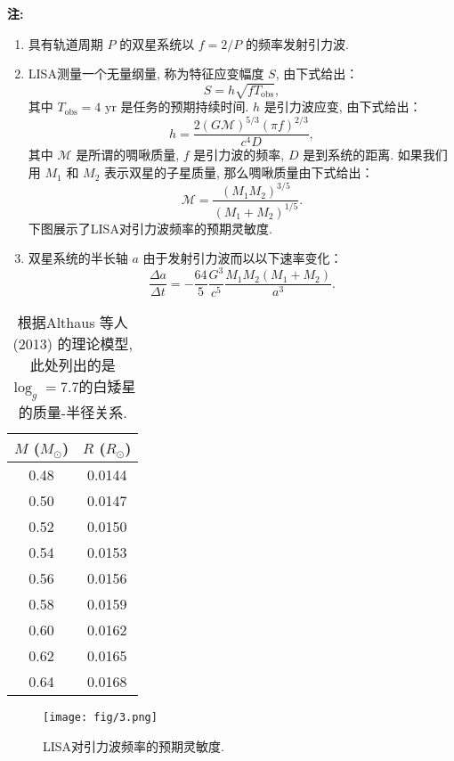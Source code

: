 \documentclass[a4paper,fontset=fandol]{ctexart}
\begin{document}
	\vspace{-1em}
	\textbf{注:}
	\begin{enumerate}
		\item 具有轨道周期 \( P \) 的双星系统以 \( f = 2/P \) 的频率发射引力波. 
		
		\item LISA测量一个无量纲量, 称为特征应变幅度 \( S \), 由下式给出：
		\[ S = h\sqrt{fT_\mathrm{obs}}, \]
		其中 \( T_\mathrm{obs} = 4\text{ yr} \) 是任务的预期持续时间. \( h \) 是引力波应变, 由下式给出：
		\[ h = \dfrac{2(G\mathcal{M})^{5/3}(\pi f)^{2/3}}{c^4D}, \]
		其中 \( \mathcal{M} \) 是所谓的啁啾质量, \( f \) 是引力波的频率, \( D \) 是到系统的距离. 如果我们用 \( M_1 \) 和 \( M_2 \) 表示双星的子星质量, 那么啁啾质量由下式给出：
		\[ \mathcal{M} = \dfrac{(M_1M_2)^{3/5}}{(M_1+M_2)^{1/5}}. \]
		下图展示了LISA对引力波频率的预期灵敏度. 
		
		\item 双星系统的半长轴 \( a \) 由于发射引力波而以以下速率变化：
		\[ \dfrac{\Delta a}{\Delta t} = -\dfrac{64}{5}\dfrac{G^3}{c^5}\dfrac{M_1M_2(M_1+M_2)}{a^3}. \]
	\end{enumerate}
	
	\begin{table}[!h]
		\centering
		\begin{tabular}{cc}
			\toprule
			$M$ ($M_\odot$) & $R$ ($R_\odot$)\\
			\midrule
			0.48&0.0144\\
			0.50&0.0147\\
			0.52&0.0150\\
			0.54&0.0153\\
			0.56&0.0156\\
			0.58&0.0159\\
			0.60&0.0162\\
			0.62&0.0165\\
			0.64&0.0168\\
			\bottomrule
		\end{tabular}
		\caption{根据Althaus 等人 (2013) 的理论模型, 此处列出的是$\log_g = 7.7$的白矮星的质量-半径关系. }
	\end{table}
	
	\begin{figure}[!h]
		\centering
		\texttt{[image: fig/3.png]}
		\caption{LISA对引力波频率的预期灵敏度. }
	\end{figure}
	
\end{document}
